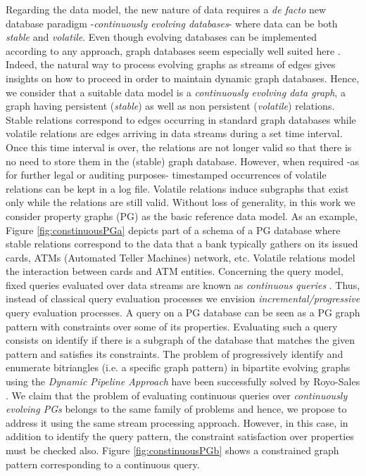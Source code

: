 \noindent
Regarding the data model, the new nature of data requires a \emph{de facto} new database paradigm -\emph{continuously evolving  databases}- where data can be both \emph{stable} and \emph{volatile}. Even though evolving databases can be implemented according to any approach, graph databases seem especially well suited  here \textcolor{blue}{\cite{angles2008survey, kumar2015graph}}. Indeed, the natural way to process evolving graphs as streams of edges gives insights on how to proceed in order to maintain dynamic graph databases.  Hence, we consider that a suitable data model is a \emph{continuously evolving data graph}, a graph having persistent (\emph{stable}) as well as non persistent (\emph{volatile}) relations. Stable relations correspond to edges occurring in standard graph databases while volatile relations are edges arriving in data streams during a set time interval. Once this time interval is over, the relations are not longer valid so that there is no need to store them in the (stable) graph database. However,  when required -as for further legal or auditing purposes- timestamped occurrences of volatile relations can  be kept in a log file. Volatile relations induce subgraphs that exist only while the relations are still valid. Without loss of generality, in this work we consider property graphs (PG) \cite{angles2017foundations, angles2018property} as the basic reference data model. As an example, Figure \ref{fig:constinuousPGa} depicts part of a schema of a PG database where stable relations correspond to the data that a bank typically gathers on its issued cards, ATMs (Automated Teller Machines) network, etc. Volatile relations model the interaction between cards and ATM entities. Concerning the query model, fixed queries evaluated over data streams are known as \emph{continuous queries} \cite{babu2001continuous,zaniolo2012logical}. Thus, instead of classical query evaluation processes we envision \emph{incremental/progressive} query evaluation processes. 
%
A query on a PG database can be seen as a PG graph pattern with constraints over some of its properties. Evaluating such a query consists on identify if there is a subgraph of the database that matches the given pattern and satisfies its constraints. 
The problem of progressively identify and enumerate bitriangles (i.e. a specific graph pattern) in bipartite evolving graphs using the \emph{Dynamic Pipeline Approach} \cite{pasarella2024computational} have been successfully solved by Royo-Sales \cite{bitriangles2021}.  We claim that the problem of evaluating continuous queries over \emph{continuously evolving PGs} belongs to the same family of problems and hence, we propose to address it using the same stream processing approach. However, in this case, in addition to identify the query pattern, the constraint satisfaction over properties must be checked also. Figure \ref{fig:constinuousPGb} shows a constrained graph pattern corresponding to a continuous query.
